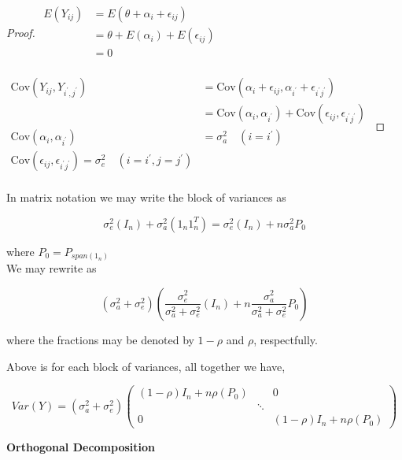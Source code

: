 \documentclass[11pt,fleqn]{book} %
\begin{document}
\begin{proof}

	$\begin{aligned}
			E(Y_{ij}) &= E(\theta + \alpha_i + \epsilon_{ij})\\
					&= \theta + E(\alpha_i) + E(\epsilon_{ij})\\
					&= 0\\
		\end{aligned}$


	$\begin{aligned}
			\text{Cov}(Y_{ij}, Y_{i^\prime, j^\prime}) &= \text{Cov}(\alpha_i + \epsilon_{ij},  \alpha_{i^\prime} + \epsilon_{i^\prime j^\prime})\\
						&= \text{Cov}(\alpha_i, \alpha_{i^\prime}) + \text{Cov}(\epsilon_{ij}, \epsilon_{i^\prime j^\prime})\\
			\text{Cov}(\alpha_i, \alpha_{i^\prime}) &= \sigma_a^2 \quad (i = i^\prime)\\
			\text{Cov}(\epsilon_{ij}, \epsilon_{i^\prime j^\prime}) = \sigma^2_e \quad (i = i^\prime, j = j^\prime)\\
		\end{aligned}$
	
\end{proof}


In matrix notation we may write the block of variances as

		$$\sigma^2_e (I_n) + \sigma^2_a (1_n 1_n^T) = \sigma^2_e (I_n) + n \sigma^2_a P_0$$

where $P_0 = P_{span(1_n)}$\\

We may rewrite as

		$$(\sigma^2_a + \sigma^2_e) (\frac{\sigma^2_e}{\sigma^2_a + \sigma^2_e}(I_n) + n\frac{\sigma^2_a }{\sigma^2_a + \sigma^2_e}P_0 ) $$

where the fractions may be denoted by $1 - \rho$ and $\rho$, respectfully. 


Above is for each block of variances, all together we have, 



		$$Var(Y) = (\sigma^2_a + \sigma^2_e) \begin{pmatrix}
			(1 - \rho)I_n + n \rho(P_0) & & 0\\
				& \ddots & \\
			0 & & (1 - \rho)I_n + n \rho(P_0)
		\end{pmatrix} $$


\textbf{Orthogonal Decomposition}\\
\end{document}
